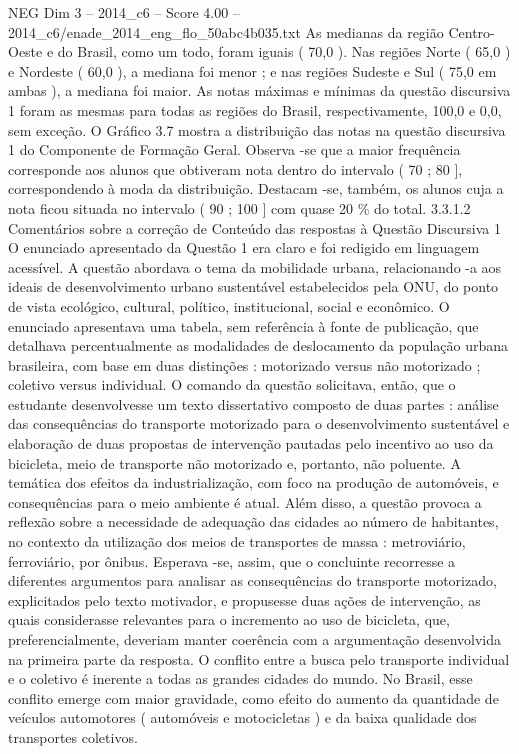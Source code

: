 \begin{textsample}{NEG Dim 3 – 2014\_c6 – Score 4.00 – 2014\_c6/enade\_2014\_eng\_flo\_50abc4b035.txt}
As medianas da região Centro-Oeste e do Brasil, como um todo, foram iguais ( 70,0 ).
Nas regiões Norte ( 65,0 ) e Nordeste ( 60,0 ), a mediana foi menor ; e nas regiões Sudeste e Sul ( 75,0 em ambas ), a mediana foi maior.
As notas máximas e mínimas da questão discursiva 1 foram as mesmas para todas as regiões do Brasil, respectivamente, 100,0 e 0,0, sem exceção.
O Gráfico 3.7 mostra a distribuição das notas na questão discursiva 1 do Componente de Formação Geral.
Observa -se que a maior frequência corresponde aos alunos que obtiveram nota dentro do intervalo ( 70 ; 80 ], correspondendo à moda da distribuição.
Destacam -se, também, os alunos cuja a nota ficou situada no intervalo ( 90 ; 100 ] com quase 20 \% do total. 3.3.1.2 Comentários sobre a correção de Conteúdo das respostas à Questão Discursiva 1 O enunciado apresentado da Questão 1 era claro e foi redigido em linguagem acessível.
A questão abordava o tema da mobilidade urbana, relacionando -a aos ideais de desenvolvimento urbano sustentável estabelecidos pela ONU, do ponto de vista ecológico, cultural, político, institucional, social e econômico.
O enunciado apresentava uma tabela, sem referência à fonte de publicação, que detalhava percentualmente as modalidades de deslocamento da população urbana brasileira, com base em duas distinções : motorizado versus não motorizado ; coletivo versus individual.
O comando da questão solicitava, então, que o estudante desenvolvesse um texto dissertativo composto de duas partes : análise das consequências do transporte motorizado para o desenvolvimento sustentável e elaboração de duas propostas de intervenção pautadas pelo incentivo ao uso da bicicleta, meio de transporte não motorizado e, portanto, não poluente.
A temática dos efeitos da industrialização, com foco na produção de automóveis, e consequências para o meio ambiente é atual.
Além disso, a questão provoca a reflexão sobre a necessidade de adequação das cidades ao número de habitantes, no contexto da utilização dos meios de transportes de massa : metroviário, ferroviário, por ônibus.
Esperava -se, assim, que o concluinte recorresse a diferentes argumentos para analisar as consequências do transporte motorizado, explicitados pelo texto motivador, e propusesse duas ações de intervenção, as quais considerasse relevantes para o incremento ao uso de bicicleta, que, preferencialmente, deveriam manter coerência com a argumentação desenvolvida na primeira parte da resposta.
O conflito entre a busca pelo transporte individual e o coletivo é inerente a todas as grandes cidades do mundo.
No Brasil, esse conflito emerge com maior gravidade, como efeito do aumento da quantidade de veículos automotores ( automóveis e motocicletas ) e da baixa qualidade dos transportes coletivos.

\end{textsample}
